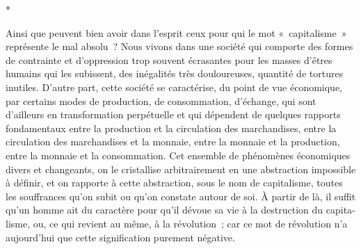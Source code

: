 \documentclass[french,twoside]{book} %
\begin{document}
\begin{center}
*\end{center}
\noindent Ainsi que peuvent bien avoir dans l'esprit ceux pour qui le mot « capitalisme » représente le mal absolu ? Nous vivons dans une société qui comporte des formes de contrainte et d'oppression trop souvent écrasantes pour les masses d'êtres humains qui les subissent, des inégalités très doulou­reuses, quantité de tortures inutiles. D'autre part, cette société se caractérise, du point de vue économique, par certains modes de production, de consom­mation, d'échange, qui sont d'ailleurs en transformation perpétuelle et qui dépendent de quelques rapports fondamentaux entre la production et la circulation des marchandises, entre la circulation des marchandises et la monnaie, entre la monnaie et la production, entre la monnaie et la consom­mation. Cet ensemble de phénomènes économiques divers et changeants, on le cristallise arbitrairement en une abstraction impossible à définir, et on rapporte à cette abstraction, sous le nom de capitalisme, toutes les souffrances qu'on subit ou qu'on constate autour de soi. À partir de là, il suffit qu'un homme ait du caractère pour qu'il dévoue sa vie à la destruction du capita­lisme, ou, ce qui revient au même, à la révolution ; car ce mot de révolution n'a aujourd'hui que cette signification purement négative.\par
\end{document}
